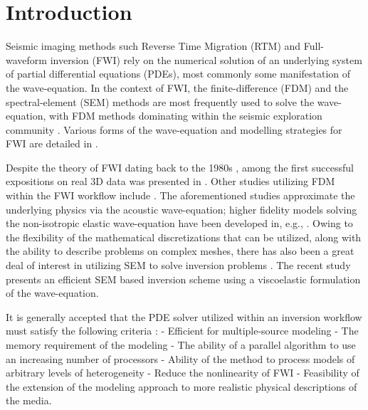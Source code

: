 \documentclass[conference]{IEEEtran}
\begin{document}
\section{Introduction}\label{introduction}

Seismic imaging methods such Reverse Time Migration (RTM) and
Full-waveform inversion (FWI) rely on the numerical solution of an
underlying system of partial differential equations (PDEs), most
commonly some manifestation of the wave-equation. In the context of FWI,
the finite-difference (FDM) and the spectral-element (SEM) methods are
most frequently used to solve the wave-equation, with FDM methods
dominating within the seismic exploration community \cite{lyu2020}.
Various forms of the wave-equation and modelling strategies for FWI are
detailed in \cite{fichtner2011}.

Despite the theory of FWI dating back to the 1980s
\cite{tarantola198, tarantola1987}, among the first successful
expositions on real 3D data was presented in \cite{sirgue2009}. Other
studies utilizing FDM within the FWI workflow include
\cite{ratcliffe2011, petersson2013}. The aforementioned studies
approximate the underlying physics via the acoustic wave-equation;
higher fidelity models solving the non-isotropic elastic wave-equation
have been developed in, e.g.,
\cite{osti_1468379, osti_1561580, osti_1561581, sava1, sava2}. Owing to
the flexibility of the mathematical discretizations that can be
utilized, along with the ability to describe problems on complex meshes,
there has also been a great deal of interest in utilizing SEM to solve
inversion problems \cite{peter2011, krebsdg}. The recent study
\cite{trinh2019} presents an efficient SEM based inversion scheme using
a viscoelastic formulation of the wave-equation.

It is generally accepted that the PDE solver utilized within an
inversion workflow must satisfy the following criteria
\cite{virieuxmodelling}: - Efficient for multiple-source modeling - The
memory requirement of the modeling - The ability of a parallel algorithm
to use an increasing number of processors - Ability of the method to
process models of arbitrary levels of heterogeneity - Reduce the
nonlinearity of FWI - Feasibility of the extension of the modeling
approach to more realistic physical descriptions of the media.
\end{document}
